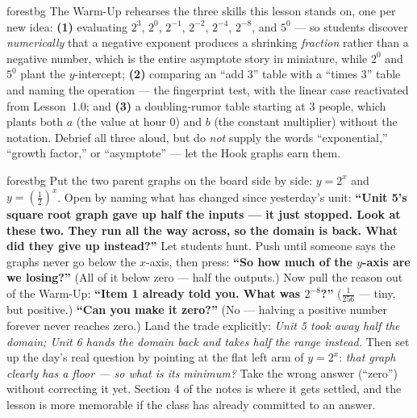 \documentclass[10pt]{article}
\begin{document}
\begin{fixedskillbox}{forestbg}
    The Warm-Up rehearses the three skills this lesson stands on, one per new idea: \textbf{(1)}
    evaluating $2^{3}$, $2^{0}$, $2^{-1}$, $2^{-2}$, $2^{-4}$, $2^{-8}$, and $5^{0}$ --- so students
    discover \emph{numerically} that a negative exponent produces a shrinking \emph{fraction} rather
    than a negative number, which is the entire asymptote story in miniature, while $2^{0}$ and
    $5^{0}$ plant the $y$-intercept; \textbf{(2)} comparing an ``add $3$'' table with a ``times $3$''
    table and naming the operation --- the fingerprint test, with the linear case reactivated from
    Lesson~1.0; and \textbf{(3)} a doubling-rumor table starting at $3$ people, which plants both
    $a$ (the value at hour $0$) and $b$ (the constant multiplier) without the notation. Debrief all
    three aloud, but do \emph{not} supply the words ``exponential,'' ``growth factor,'' or
    ``asymptote'' --- let the Hook graphs earn them.
\end{fixedskillbox}

\begin{skillbox}[Hook]{forestbg}
    Put the two parent graphs on the board side by side: $y=2^{x}$ and $y=\left(\frac12\right)^{x}$.
    Open by naming what has changed since yesterday's unit: \textbf{``Unit 5's square root graph gave
    up half the inputs --- it just stopped. Look at these two. They run all the way across, so the
    domain is back. What did they give up instead?''} Let students hunt. Push until someone says the
    graphs never go below the $x$-axis, then press: \textbf{``So how much of the $y$-axis are we
    losing?''} (All of it below zero --- half the outputs.) Now pull the reason out of the Warm-Up:
    \textbf{``Item 1 already told you. What was $2^{-8}$?''} ($\frac{1}{256}$ --- tiny, but positive.)
    \textbf{``Can you make it zero?''} (No --- halving a positive number forever never reaches zero.)
    Land the trade explicitly: \emph{Unit 5 took away half the domain; Unit 6 hands the domain back
    and takes half the range instead.} Then set up the day's real question by pointing at the flat
    left arm of $y=2^{x}$: \emph{that graph clearly has a floor --- so what is its minimum?} Take the
    wrong answer (``zero'') without correcting it yet. Section 4 of the notes is where it gets
    settled, and the lesson is more memorable if the class has already committed to an answer.
\end{skillbox}
\end{document}
